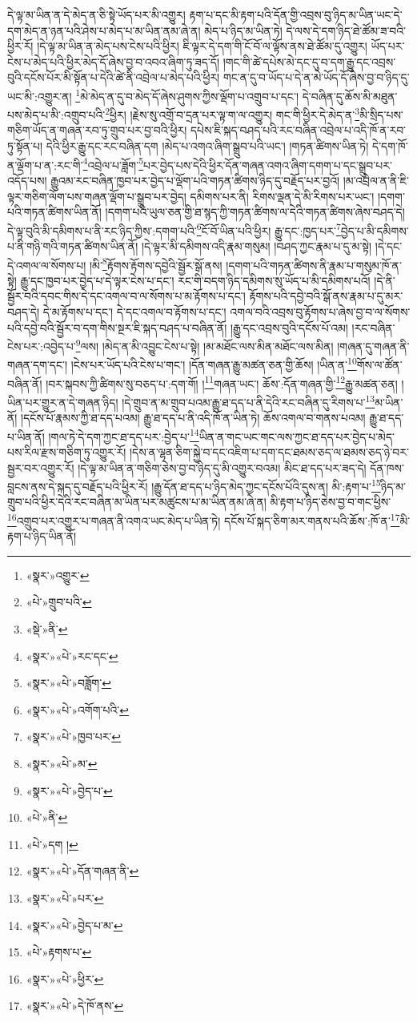 དེ་ལྟ་མ་ཡིན་ན་དེ་མེད་ན་ཅི་སྟེ་ཡོད་པར་མི་འགྱུར། རྟག་པ་དང་མི་རྟག་པའི་དོན་གྱི་འབྲས་བུ་ཉིད་མ་ཡིན་ཡང་དེ་དག་མེད་ན་ཉན་པའི་ཤེས་པ་མེད་པ་མ་ཡིན་ནམ་ཞེ་ན། མེད་པ་ཉིད་མ་ཡིན་ཏེ། དེ་ལས་དེ་དག་ཉིད་ཐེ་ཚོམ་ཟ་བའི་ཕྱིར་རོ། །དེ་ལྟ་མ་ཡིན་ན་མེད་པས་ངེས་པའི་ཕྱིར། ཇི་ལྟར་དེ་དག་གི་ངོ་བོ་ལ་ལྟོས་ནས་ཐེ་ཚོམ་དུ་འགྱུར། ཡོད་པར་ངེས་པ་མེད་པའི་ཕྱིར་མེད་དོ་ཞེས་བྱ་བ་འབའ་ཞིག་ཏུ་ཟད་དོ། །གང་གི་ཚེ་དཔེས་མེ་དང་དུ་བ་དག་རྒྱུ་དང་འབྲས་བུའི་དངོས་པོར་མི་སྟོན་པ་དེའི་ཚེ་ནི་འབྲེལ་པ་མེད་པའི་ཕྱིར། གང་ན་དུ་བ་ཡོད་པ་དེ་ན་མེ་ཡོད་དོ་ཞེས་བྱ་བ་ཉིད་དུ་ཡང་མི་:འགྱུར་ན། \footnote{«སྣར་»འགྱུར་}མེ་མེད་ན་དུ་བ་མེད་དོ་ཞེས་ཤུགས་ཀྱིས་ལྡོག་པ་འགྲུབ་པ་དང་། དེ་བཞིན་དུ་ཆོས་མི་མཐུན་པས་མེད་པ་མི་:འགྲུབ་པའི་\footnote{«པེ་»གྲུབ་པའི་}ཕྱིར། །རྗེས་སུ་འགྲོ་བ་དྲན་པར་ལྟ་ག་ལ་འགྱུར། གང་གི་ཕྱིར་དེ་མེད་ན་\footnote{«སྡེ་»ནི་}མི་སྲིད་པས་གཅིག་ཡོད་ན་གཞན་རབ་ཏུ་གྲུབ་པར་བྱ་བའི་ཕྱིར། དཔེས་ཇི་སྐད་བཤད་པའི་རང་བཞིན་འབྲེལ་པ་འདི་ཁོ་ན་རབ་ཏུ་སྟོན་པ། དེའི་ཕྱིར་རྒྱུ་དང་རང་བཞིན་དག །མེད་པ་འགའ་ཞིག་སྒྲུབ་པའི་ཡང་། །གཏན་ཚིགས་ཡིན་ཏེ། དེ་དག་ཁོ་ན་ལྡོག་པ་ན་:རང་གི་\footnote{«སྣར་»«པེ་»རང་དང་}འབྲེལ་པ་ཟློག་\footnote{«སྣར་»«པེ་»བཟློག་}པར་བྱེད་པས་དེའི་ཕྱིར་དོན་གཞན་འགའ་ཞིག་དགག་པ་དང་སྒྲུབ་པར་འདོད་པས། རྒྱུའམ་རང་བཞིན་ཁྱབ་པར་བྱེད་པ་ལྡོག་པའི་གཏན་ཚིགས་ཉིད་དུ་བརྗོད་པར་བྱའོ། །མ་འབྲེལ་ན་ནི་ཇི་ལྟར་གཅིག་ལོག་པས་གཞན་ལྡོག་པ་སྒྲུབ་པར་བྱེད། དམིགས་པར་ནི། རིགས་ལྡན་དེ་མི་རིགས་པར་ཡང་། །དགག་པའི་གཏན་ཚིགས་ཡིན་ནོ། །དགག་པའི་ཡུལ་ཅན་གྱི་ཐ་སྙད་ཀྱི་གཏན་ཚིགས་ལ་དེའི་གཏན་ཚིགས་ཞེས་བཤད་དེ། དེ་ལྟ་བུའི་མི་དམིགས་པ་ནི་རང་ཉིད་ཀྱིས་:དགག་པའི་\footnote{«སྣར་»«པེ་»འགོག་པའི་}ངོ་བོ་ཡིན་པའི་ཕྱིར། རྒྱུ་དང་:ཁྱད་པར་\footnote{«སྣར་»«པེ་»ཁྱབ་པར་}བྱེད་པ་མི་དམིགས་པ་ནི་གཉི་གའི་གཏན་ཚིགས་ཡིན་ནོ། །དེ་ལྟར་མི་དམིགས་འདི་རྣམ་གསུམ། །བཤད་ཀྱང་རྣམ་པ་དུ་མ་སྟེ། །དེ་དང་དེ་འགལ་ལ་སོགས་པ། །མི་\footnote{«སྣར་»«པེ་»མ་}རྟོགས་རྟོགས་དབྱེའི་སྦྱོར་སྒོ་ནས། །དགག་པའི་གཏན་ཚིགས་ནི་རྣམ་པ་གསུམ་ཁོ་ན་སྟེ། རྒྱུ་དང་ཁྱབ་པར་བྱེད་པ་དེ་ལྟར་ངེས་པ་དང་། རང་གི་བདག་ཉིད་དམིགས་སུ་ཡོད་པ་མི་དམིགས་པའོ། །དེ་ནི་སྦྱོར་བའི་དབང་གིས་དེ་དང་འགལ་བ་ལ་སོགས་པ་མ་རྟོགས་པ་དང་། རྟོགས་པའི་དབྱེ་བའི་སྒོ་ནས་རྣམ་པ་དུ་མར་བཤད་དེ། དེ་མ་རྟོགས་པ་དང་། དེ་དང་འགལ་བ་རྟོགས་པ་དང་། འགལ་བའི་འབྲས་བུ་རྟོགས་པ་ཞེས་བྱ་བ་ལ་སོགས་པའི་དབྱེ་བའི་སྦྱོར་བ་དག་གིས་སྔར་ཇི་སྐད་བཤད་པ་བཞིན་ནོ། །རྒྱུ་དང་འབྲས་བུའི་དངོས་པོ་འམ། །རང་བཞིན་ངེས་པར་:འབྱེད་པ་\footnote{«སྣར་»«པེ་»བྱེད་པ་}ལས། །མེད་ན་མི་འབྱུང་ངེས་པ་སྟེ། །མ་མཐོང་ལས་མིན་མཐོང་ལས་མིན། །གཞན་དུ་གཞན་ནི་གཞན་དག་དང་། །ངེས་པར་ཡོད་པའི་ངེས་པ་གང་། །དོན་གཞན་རྒྱུ་མཚན་ཅན་གྱི་ཆོས། །ཡིན་ན་\footnote{«པེ་»ནི་}གོས་ལ་ཚོན་བཞིན་ནོ། །བར་སྐབས་ཀྱི་ཚིགས་སུ་བཅད་པ་:དག་གོ། །\footnote{«པེ་»དག །}གཞན་ཡང་། ཆོས་:དོན་གཞན་གྱི་\footnote{«སྣར་»«པེ་»དོན་གཞན་ནི་}རྒྱུ་མཚན་ཅན། །ཡིན་པར་གྱུར་ན་དེ་གཞན་ཉིད། །དེ་གྲུབ་ན་མ་གྲུབ་པའམ་རྒྱུ་ཐ་དད་པ་ནི་དེའི་རང་བཞིན་དུ་རིགས་པ་\footnote{«སྣར་»«པེ་»པར་}མ་ཡིན་ནོ། །དངོས་པོ་རྣམས་ཀྱི་ཐ་དད་པའམ། རྒྱུ་ཐ་དད་པ་ནི་འདི་ཁོ་ན་ཡིན་ཏེ། ཆོས་འགལ་བ་གནས་པའམ། རྒྱུ་ཐ་དད་པ་ཡིན་ནོ། །གལ་ཏེ་དེ་དག་ཀྱང་ཐ་དད་པར་:བྱེད་པ་\footnote{«སྣར་»«པེ་»བྱེད་པ་མ་}ཡིན་ན་གང་ཡང་གང་ལས་ཀྱང་ཐ་དད་པར་བྱེད་པ་མེད་པས་རིལ་རྫས་གཅིག་ཏུ་འགྱུར་རོ། །དེས་ན་ལྷན་ཅིག་སྐྱེ་བ་དང་འཇིག་པ་དག་དང་ཐམས་ཅད་ལ་ཐམས་ཅད་ཉེ་བར་སྦྱར་བར་འགྱུར་རོ། །དེ་ལྟ་མ་ཡིན་ན་གཅིག་ཅེས་བྱ་བ་ཉིད་དུ་མི་འགྱུར་བའམ། མིང་ཐ་དད་པར་ཟད་དེ། དོན་ཁས་བླངས་ནས་དེ་སྐད་དུ་བརྗོད་པའི་ཕྱིར་རོ། །རྒྱུ་དོན་ཐ་དད་པ་ཉིད་མེད་ཀྱང་དངོས་པོའི་དུས་ན། མི་:རྟག་པ་\footnote{«པེ་»རྟགས་པ་}ཉིད་མ་གྲུབ་པའི་ཕྱིར་དེའི་རང་བཞིན་མ་ཡིན་པར་མཚུངས་པ་མ་ཡིན་ནམ་ཞེ་ན། མི་རྟག་པ་ཉིད་ཅེས་བྱ་བ་གང་ཕྱིས་\footnote{«སྣར་»«པེ་»ཕྱིར་}འགྲུབ་པར་འགྱུར་པ་གཞན་ནི་འགའ་ཡང་མེད་པ་ཡིན་ཏེ། དངོས་པོ་སྐད་ཅིག་མར་གནས་པའི་ཆོས་:ཁོ་ན་\footnote{«སྣར་»«པེ་»དེ་ཁོ་ནས་}མི་རྟག་པ་ཉིད་ཡིན་ནོ། 